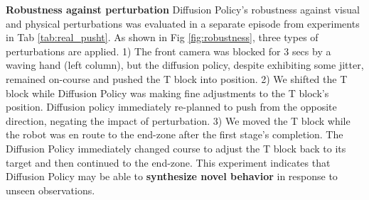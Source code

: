 \textbf{Robustness against perturbation}
Diffusion Policy's robustness against visual and physical perturbations was evaluated in a separate episode from experiments in Tab \ref{tab:real_pusht}. As shown in Fig \ref{fig:robustness}, three types of perturbations are applied. 
1) The front camera was blocked for 3 secs by a waving hand (left column), but the diffusion policy, despite exhibiting some jitter, remained on-course and pushed the T block into position.
2) We shifted the T block while Diffusion Policy was making fine adjustments to the T block's position. Diffusion policy immediately re-planned to push from the opposite direction, negating the impact of perturbation. 
3) We moved the T block while the robot was en route to the end-zone after the first stage's completion. The Diffusion Policy immediately changed course to adjust the T block back to its target and then continued to the end-zone. This experiment indicates that Diffusion Policy may be able to \textbf{synthesize novel behavior} in response to unseen observations.

